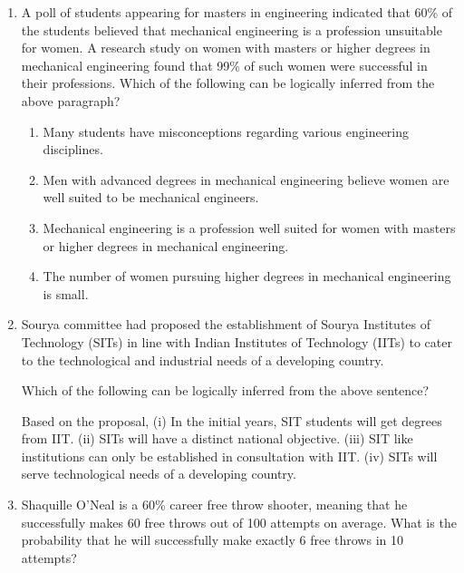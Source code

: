 \documentclass[journal,12pt,onecolumn]{IEEEtran}
\theoremstyle{remark}
\begin{document}
\begin{enumerate}
\item A poll of students appearing for masters in engineering indicated that 60\% of the students believed that mechanical engineering is a profession unsuitable for women. A research study on women with masters or higher degrees in mechanical engineering found that 99\% of such women were successful in their professions.
Which of the following can be logically inferred from the above paragraph?
    \begin{enumerate}
        \item Many students have misconceptions regarding various engineering disciplines.
        \item Men with advanced degrees in mechanical engineering believe women are well suited to be mechanical engineers.
        \item Mechanical engineering is a profession well suited for women with masters or higher degrees in mechanical engineering.
        \item The number of women pursuing higher degrees in mechanical engineering is small.
    \end{enumerate}

\item Sourya committee had proposed the establishment of Sourya Institutes of Technology (SITs) in line with Indian Institutes of Technology (IITs) to cater to the technological and industrial needs of a developing country.

Which of the following can be logically inferred from the above sentence?

Based on the proposal,
(i) In the initial years, SIT students will get degrees from IIT.
(ii) SITs will have a distinct national objective.
(iii) SIT like institutions can only be established in consultation with IIT.
(iv) SITs will serve technological needs of a developing country.

\begin{enumerate}
\end{enumerate}

\item Shaquille O'Neal is a 60\% career free throw shooter, meaning that he successfully makes 60 free throws out of 100 attempts on average. What is the probability that he will successfully make exactly 6 free throws in 10 attempts?


\end{enumerate}
\end{document}
